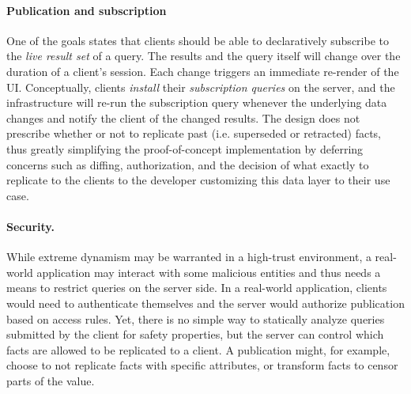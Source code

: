 \paragraph{Publication and subscription}

One of the goals states that clients should be able to declaratively subscribe to the \emph{live result set} of a query. The results and the query itself will change over the duration of a client's session. Each change triggers an immediate re-render of the UI. Conceptually, clients \emph{install} their \emph{subscription queries} on the server, and the infrastructure will re-run the subscription query whenever the underlying data changes and notify the client of the changed results. The design does not prescribe whether or not to replicate past (i.e. superseded or retracted) facts, thus greatly simplifying the proof-of-concept implementation by deferring concerns such as diffing, authorization, and the decision of what exactly to replicate to the clients to the developer customizing this data layer to their use case.

\paragraph{Security.} While extreme dynamism may be warranted in a high-trust environment, a real-world application may interact with some malicious entities and thus needs a means to restrict queries on the server side. In a real-world application, clients would need to authenticate themselves and the server would authorize publication based on access rules. Yet, there is no simple way to statically analyze queries submitted by the client for safety properties, but the server can control which facts are allowed to be replicated to a client. A publication might, for example, choose to not replicate facts with specific attributes, or transform facts to censor parts of the value.
